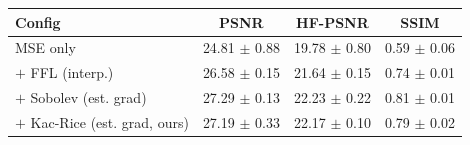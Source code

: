 \begin{tabular}{lccc}
\toprule
Config & PSNR & HF-PSNR & SSIM \\
\midrule
MSE only & 24.81 $\pm$ 0.88 & 19.78 $\pm$ 0.80 & 0.59 $\pm$ 0.06 \\
$+$ FFL (interp.) & 26.58 $\pm$ 0.15 & 21.64 $\pm$ 0.15 & 0.74 $\pm$ 0.01 \\
$+$ Sobolev (est. grad) & 27.29 $\pm$ 0.13 & 22.23 $\pm$ 0.22 & 0.81 $\pm$ 0.01 \\
$+$ Kac-Rice (est. grad, ours) & 27.19 $\pm$ 0.33 & 22.17 $\pm$ 0.10 & 0.79 $\pm$ 0.02 \\
\bottomrule
\end{tabular}